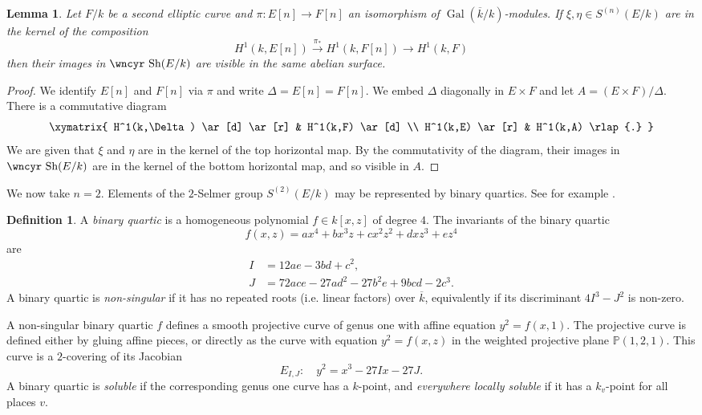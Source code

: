 \documentclass[12pt]{amsart}
\newcommand{\Gal}{{\operatorname{Gal}}}
\newcommand{\ra}{\longrightarrow}
\newcommand{\PP}{{\mathbb P}}
\newcommand{\kbar}{{\overline k}}
\newcommand{\Sha}{\mbox{\wncyr Sh}}
\newtheorem{Lemma}[Proposition]{Lemma}
\theoremstyle{definition}
\newtheorem{Definition}[Proposition]{Definition}
\begin{document}
\begin{Lemma}
\label{vislem}
Let $F/k$ be a second elliptic curve and $\pi: E[n] \to F[n]$ an
isomorphism of $\Gal(\kbar/k)$-modules. If
$\xi, \eta \in S^{(n)}(E/k)$ are in the kernel of the composition
\[ H^1(k,E[n]) \stackrel{\pi_*}{\ra} H^1(k,F[n]) \ra H^1(k,F) \] then
their images in $\Sha(E/k)$ are visible in the same abelian surface.
\end{Lemma}

\begin{proof} We identify $E[n]$ and $F[n]$ via $\pi$ and write
  $\Delta = E[n] = F[n]$.  We embed $\Delta$ diagonally in
  $E \times F$ and let $A = (E \times F)/\Delta$.  There is a
  commutative diagram
  \[ \xymatrix{ H^1(k,\Delta) \ar[d] \ar[r]
      & H^1(k,F) \ar[d] \\
      H^1(k,E) \ar[r] & H^1(k,A) \rlap{.} } \]
  We are given that $\xi$ and $\eta$ are in the kernel of the top
  horizontal map. By the commutativity of the diagram,
  their images in $\Sha(E/k)$ %
  are in the kernel of the bottom horizontal map, and so visible in $A$.
\end{proof}

We now take $n=2$. Elements of the $2$-Selmer group $S^{(2)}(E/k)$ may
be represented by binary quartics. See for example
\cite{AKM3P,BSDI,Cr,CF,Weil54}.

\begin{Definition}
A {\em binary quartic} is a homogeneous polynomial
$f \in k[x,z]$ of degree $4$. The invariants of the binary quartic
\begin{equation*}
f(x,z) = a x^4 + b x^3 z + c x^2 z^2 + d x z^3 + e z^4
\end{equation*}
are
\begin{equation}
\label{def:IJ}
\begin{aligned}
I &= 12 a e - 3 b d + c^2 , \\
J &= 72 a c e - 27 a d^2 - 27 b^2 e + 9 b c d - 2 c^3.
\end{aligned}
\end{equation}
A binary quartic is {\em non-singular} if it has no repeated roots
(i.e. linear factors) over $\kbar$,
equivalently if its discriminant $4 I^3 - J^2$ is non-zero.
\end{Definition}

A non-singular binary quartic $f$ defines a smooth projective curve of
genus one with affine equation $y^2 = f(x,1)$. The projective curve
is defined either by gluing affine pieces, or directly as the curve
with equation $y^2 = f(x,z)$ in the weighted projective plane
$\PP(1,2,1)$. This curve is a $2$-covering of its Jacobian
\begin{equation}
\label{jac}
 E_{I,J} : \quad y^2 = x^3 - 27 I x - 27 J. 
\end{equation}
A binary quartic is {\em soluble} if the corresponding genus one curve
has a $k$-point, and {\em everywhere locally soluble} if it has a
$k_v$-point for all places $v$.
\end{document}
